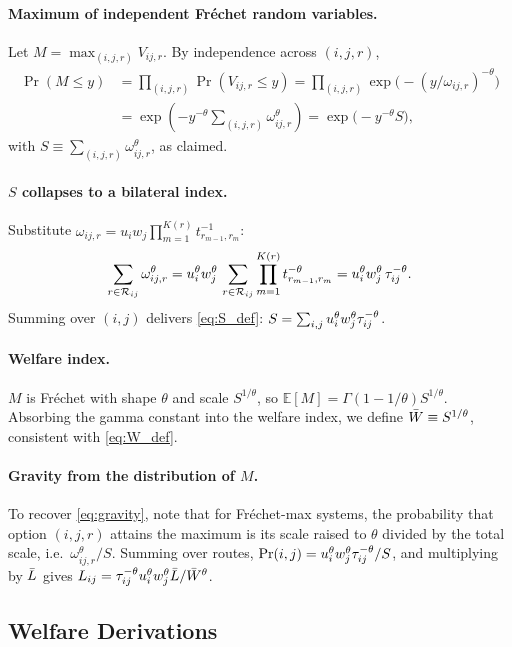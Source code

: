 \paragraph{Maximum of independent Fr\'echet random variables.}
Let $M=\max_{(i,j,r)}V_{ij,r}$.  By independence across $(i,j,r)$,
\begin{align*}
  \Pr(M\le y)
  &=\prod_{(i,j,r)}\Pr(V_{ij,r}\le y)
   =\prod_{(i,j,r)}\exp\bigl(-(y/\omega_{ij,r})^{-\theta}\bigr)\\
  &=\exp\!\left(-y^{-\theta}\sum_{(i,j,r)}\omega_{ij,r}^{\theta}\right)
   =\exp\bigl(-y^{-\theta}S\bigr),
\end{align*}
with $S\equiv\sum_{(i,j,r)}\omega_{ij,r}^{\theta}$, as claimed.

\paragraph{$S$ collapses to a bilateral index.}
Substitute $\omega_{ij,r}=u_i w_j\prod_{m=1}^{K(r)}t_{r_{m-1},r_m}^{-1}$:
\[
  \sum_{r\in\mathcal R_{ij}}\omega_{ij,r}^{\theta}
  =u_i^{\theta}w_j^{\theta}\,\sum_{r\in\mathcal R_{ij}}
     \prod_{m=1}^{K(r)}t_{r_{m-1},r_m}^{-\theta}
  =u_i^{\theta}w_j^{\theta}\,\tau_{ij}^{-\theta}.
\]
Summing over $(i,j)$ delivers \eqref{eq:S_def}:
$S=\sum_{i,j}u_i^{\theta}w_j^{\theta}\tau_{ij}^{-\theta}$.

\paragraph{Welfare index.}
$M$ is Fr\'echet with shape $\theta$ and scale $S^{1/\theta}$, so
$\mathbb E[M]=\Gamma(1-1/\theta)S^{1/\theta}$.  Absorbing the
gamma constant into the welfare index, we define
$\bar W\equiv S^{1/\theta}$, consistent with \eqref{eq:W_def}.

\paragraph{Gravity from the distribution of $M$.}
To recover \eqref{eq:gravity}, note that for Fr\'echet-max systems,
the probability that option $(i,j,r)$ attains the maximum is its
scale raised to $\theta$ divided by the total scale, i.e.\
$\omega_{ij,r}^{\theta}/S$.  Summing over routes,
$\Pr(i,j)=u_i^{\theta}w_j^{\theta}\tau_{ij}^{-\theta}/S$, and
multiplying by $\bar L$ gives
$L_{ij}=\tau_{ij}^{-\theta}u_i^{\theta}w_j^{\theta}\bar L/\bar W^{\theta}$.

\subsection{Welfare Derivations}\label{app:welfare2}

